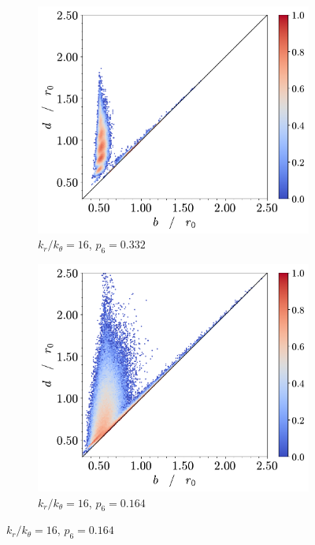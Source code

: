\begin{figure}[tbp]
        \begin{subfigure}[b]{0.40\textwidth}
         \centering
         \includegraphics[width=\textwidth]{./figures/ph/t_k16_231_bs_pd.pdf}
         \caption{$k_r/k_\theta=16$, $p_6=0.332$}%
         \label{fig:bspdc}
     \end{subfigure}
     \hspace{2cm}
      \begin{subfigure}[b]{0.40\textwidth}
         \centering
         \includegraphics[width=\textwidth]{./figures/ph/t_k16_0_bs_pd.pdf}
         \caption{$k_r/k_\theta=16$, $p_6=0.164$}%
         \label{fig:bspdd}
     \end{subfigure}



\end{figure}
